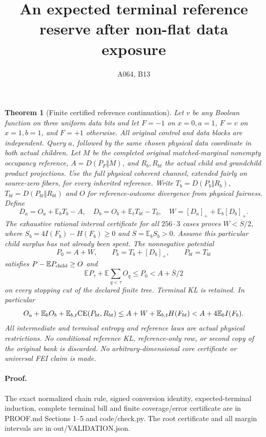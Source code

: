 \documentclass{article}\usepackage{amsmath,amssymb,amsthm}
\newtheorem{theorem}{Theorem}
\begin{document}
\title{An expected terminal reference reserve after non-flat data exposure}
\author{A064, B13}\maketitle
\begin{theorem}[Finite certified reference continuation]
Let $v$ be any Boolean function on three uniform data bits and let
$F=-1$ on $x=0,a=1$, $F=v$ on $x=1,b=1$, and $F=+1$ otherwise.
All original control and data blocks are independent. Query $a$, followed
by the same chosen physical data coordinate in both actual children.
Let $M$ be the completed original matched-marginal nonempty occupancy
reference, $A=D(P_F\Vert M)$, and $R_b,R_{bt}$ the actual child and
grandchild product projections. Use the full physical coherent channel,
extended fairly on source-zero fibers, for every inherited reference.
Write $T_b=D(P_b\Vert R_b)$, $T_{bt}=D(P_{bt}\Vert R_{bt})$ and $O$
for reference-outcome divergence from physical fairness. Define
\[
D_a=O_a+\mathbb E_b T_b-A,\quad
D_b=O_b+\mathbb E_t T_{bt}-T_b,\quad
W=[D_a]_++\mathbb E_b[D_b]_+.
\]
The exhaustive rational interval certificate for all $256\cdot3$ cases
proves $W<\overline S/2$, where
$S_b=4I(F_b)-H(F_b)\ge0$ and $\overline S=\mathbb E_bS_b>0$.
Assume this particular child surplus has not already been spent.
The nonnegative potential
\[
P_0=A+W,\qquad P_b=T_b+[D_b]_+,\qquad P_{bt}=T_{bt}
\]
satisfies $P-\mathbb E P_{\rm child}\ge O$ and
\[
\mathbb E P_\tau+\mathbb E\sum_{q<\tau}O_q\le P_0<A+\overline S/2
\]
on every stopping cut of the declared finite tree. Terminal KL is
retained. In particular
\[
O_a+\mathbb E_bO_b+\mathbb E_{b,t}{\rm CE}(P_{bt},R_{bt})
\le A+W+\mathbb E_{b,t}H(F_{bt})
< A+4\mathbb E_b I(F_b).
\]
All intermediate and terminal entropy and reference laws are actual
physical restrictions. No conditional reference KL, reference-only row,
or second copy of the original bank is discarded. No arbitrary-dimensional
core certificate or universal FEI claim is made.
\end{theorem}
\paragraph{Proof.} The exact normalized chain rule, signed conversion
identity, expected-terminal induction, complete terminal bill and finite
coverage/error certificate are in PROOF.md Sections 1--5 and code/check.py.
The root certificate and all margin intervals are in out/VALIDATION.json.
\end{document}
